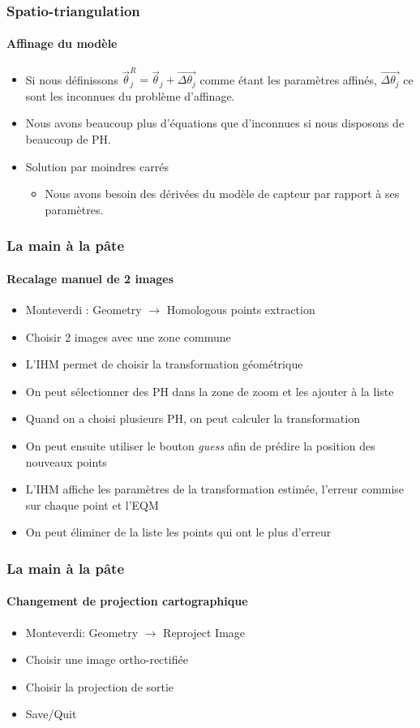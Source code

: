 \documentclass[compress]{beamer}
\begin{document}
\begin{frame}
  \frametitle{Spatio-triangulation}
  \framesubtitle{Affinage du modèle}
  \begin{itemize}
    \item Si nous définissons $\vec\theta_j^R = \vec\theta_j +
    \vec{\Delta\theta_j}$ comme étant les paramètres affinés,
    $\vec{\Delta\theta_j}$ ce sont les inconnues du problème d'affinage.
    \item Nous avons beaucoup plus d'équations que d'inconnues si nous
      disposons de beaucoup de PH.
    \item Solution par moindres carrés
      \begin{itemize}
	\item Nous avons besoin des dérivées du modèle de capteur par
          rapport à ses paramètres.
      \end{itemize}
  \end{itemize}
  
\end{frame}

\begin{frame}
  \frametitle{La main à la pâte}
  \framesubtitle{Recalage manuel de 2 images}
\vspace*{-0.6cm}
\small
  \begin{itemize}
  \item Monteverdi : Geometry $\rightarrow$ Homologous points extraction
  \item Choisir 2 images avec une zone commune
  \item L'IHM permet de choisir la transformation géométrique
  \item On peut sélectionner des PH dans la zone de zoom et les
    ajouter à la liste
  \item Quand on a choisi plusieurs PH, on peut calculer la transformation
  \item On peut ensuite utiliser le bouton {\em guess} afin de prédire
    la position des nouveaux points
  \item L'IHM affiche les paramètres de la transformation estimée,
    l'erreur commise sur chaque point et l'EQM
  \item On peut éliminer de la liste les points qui ont le plus d'erreur
  \end{itemize}
\end{frame}



\begin{frame}
  \frametitle{La main à la pâte}
  \framesubtitle{Changement de projection cartographique}
  \begin{itemize}
  \item Monteverdi: Geometry $\rightarrow$ Reproject Image
  \item Choisir une image ortho-rectifiée
  \item Choisir la projection de sortie
  \item Save/Quit
  \end{itemize}
\end{frame}
\end{document}
